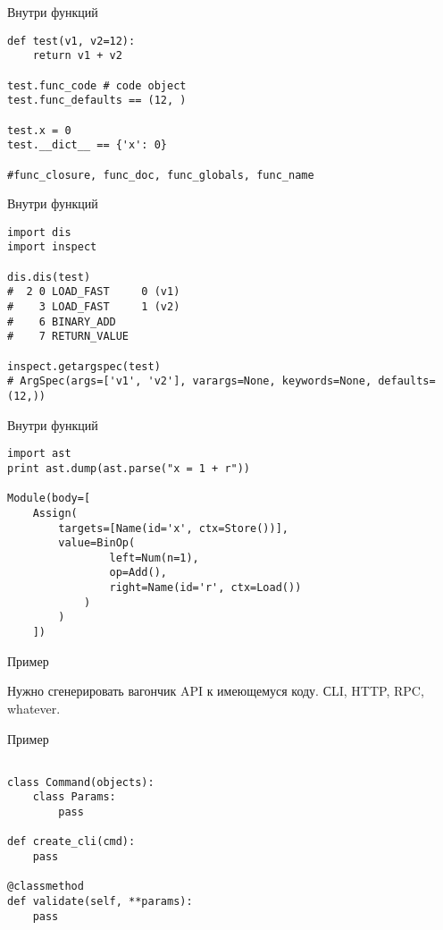 \documentclass{article}
\begin{document}
\begin{center} Внутри функций \end{center}
\begin{lstlisting}
def test(v1, v2=12):
    return v1 + v2

test.func_code # code object
test.func_defaults == (12, )

test.x = 0
test.__dict__ == {'x': 0}

#func_closure, func_doc, func_globals, func_name
\end{lstlisting}
\newpage

\begin{center} Внутри функций \end{center}
\begin{lstlisting}
import dis
import inspect

dis.dis(test)
#  2 0 LOAD_FAST     0 (v1)
#    3 LOAD_FAST     1 (v2)
#    6 BINARY_ADD       
#    7 RETURN_VALUE

inspect.getargspec(test)
# ArgSpec(args=['v1', 'v2'], varargs=None, keywords=None, defaults=(12,))
\end{lstlisting}
\newpage

\begin{center} Внутри функций \end{center}
\begin{lstlisting}
import ast
print ast.dump(ast.parse("x = 1 + r"))

Module(body=[
    Assign(
        targets=[Name(id='x', ctx=Store())], 
        value=BinOp(
                left=Num(n=1), 
                op=Add(), 
                right=Name(id='r', ctx=Load())
            )
        )
    ])
\end{lstlisting}
\newpage

\begin{center}Пример\end{center}
Нужно сгенерировать вагончик API к имеющемуся коду.
СLI, HTTP, RPC, whatever.
\newpage

\begin{center}Пример\end{center}
\begin{lstlisting}

class Command(objects):
    class Params:
        pass

def create_cli(cmd):
    pass

@classmethod
def validate(self, **params):
    pass
\end{lstlisting}
\newpage

\end{document}
